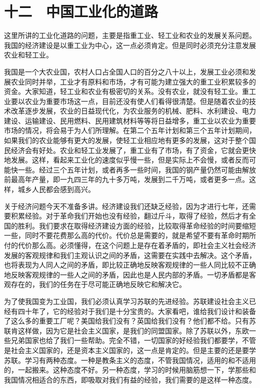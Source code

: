 \section{十二　中国工业化的道路}

这里所讲的工业化道路的问题，主要是指重工业、轻工业和农业的发展关系问题。我国的经济建设是以重工业为中心，这一点必须肯定。但是同时必须充分注意发展农业和轻工业。

我国是一个大农业国，农村人口占全国人口的百分之八十以上，发展工业必须和发展农业同时并举，工业才有原料和市场，才有可能为建立强大的重工业积累较多的资金。大家知道，轻工业和农业有极密切的关系。没有农业，就没有轻工业。重工业要以农业为重要市场这一点，目前还没有使人们看得很清楚。但是随着农业的技术改革逐步发展，农业的日益现代化，为农业服务的机械、肥料、水利建设、电力建设、运输建设、民用燃料、民用建筑材料等等将日益增多，重工业以农业为重要市场的情况，将会易于为人们所理解。在第二个五年计划和第三个五年计划期间，如果我们的农业能够有更大的发展，使轻工业相应地有更多的发展，这对于整个国民经济会有好处。农业和轻工业发展了，重工业有了市场，有了资金，它就会更快地发展。这样，看起来工业化的速度似乎慢一些，但是实际上不会慢，或者反而可能快一些。经过三个五年计划，或者再多一些时间，我国的钢产量仍然可能由解放前最高年产量，即一九四三年的九十多万吨，发展到二千万吨，或者更多一点。这样，城乡人民都会感到高兴。

关于经济问题今天不准备多讲。经济建设我们还缺乏经验，因为才进行七年，还需要积累经验。对于革命我们开始也没有经验，翻过斤斗，取得了经验，然后才有全国的胜利。我们要求在取得经济建设方面的经验，比较取得革命经验的时间要缩短一些，同时不要花费那么高的代价。代价总是需要的，就是希望不要有革命时期所付的代价那么高。必须懂得，在这个问题上是存在着矛盾的，即社会主义社会经济发展的客观规律和我们主观认识之间的矛盾，这需要在实践中去解决。这个矛盾，也将表现为人同人之间的矛盾，即比较正确地反映客观规律的一些人同比较不正确地反映客观规律的一些人之间的矛盾，因此也是人民内部的矛盾。一切矛盾都是客观存在的，我们的任务在于尽可能正确地反映它和解决它。

为了使我国变为工业国，我们必须认真学习苏联的先进经验。苏联建设社会主义已经有四十年了，它的经验对于我们是十分宝贵的。大家看吧，谁给我们设计和装备了这么多的重要工厂呢？美国给我们没有？英国给我们没有？他们都不给。只有苏联肯这样做，因为它是社会主义国家，是我们的同盟国家。除了苏联以外，东欧一些兄弟国家也给了我们一些帮助。完全不错，一切国家的好经验我们都要学，不管是社会主义国家的，还是资本主义国家的，这一点是肯定的。但是主要的还是要学苏联。学习有两种态度。一种是教条主义的态度，不管我国情况，适用的和不适用的，一起搬来。这种态度不好。另一种态度，学习的时候用脑筋想一下，学那些和我国情况相适合的东西，即吸取对我们有益的经验，我们需要的是这样一种态度。

